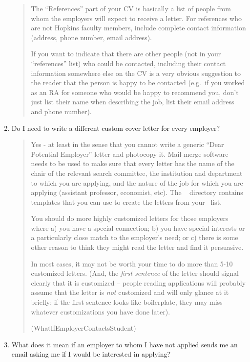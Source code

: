 \documentclass{\classes/econtex}
\providecommand\phantomsection{}
\begin{document}
\begin{enumerate}
    \begin{quote}
      The ``References'' part of your CV is basically a list of people from
      whom the employers will expect to receive a letter.  For references who
      are not Hopkins faculty members, include complete contact information
      (address, phone number, email address).

      If you want to indicate that there are other people (not in your
      ``references'' list) who could be contacted, including their contact
      information somewhere else on the CV is a very obvious suggestion to
      the reader that the person is happy to be contacted (e.g.\ if you
      worked as an RA for someone who would be happy to recommend you,
      don't just list their name when describing the job, list their email
      address and phone number).


    \end{quote}
  \item  Do I need to write a different custom cover letter for every employer?
    
    \begin{quote}
      Yes - at least in the sense that you cannot write a generic ``Dear Potential Employer'' letter
      and photocopy it.  Mail-merge software needs to be used to make sure
      that every letter has the name of the chair of the relevant search
      committee, the institution and department to which you are applying,
      and the nature of the job for which you are applying (assistant
      professor, economist, etc).  The \Templates~ directory contains templates that 
      you can use to create the letters from your \EMtt~list.  
      
      You should do more highly customized letters for those employers
      where a) you have a special connection; b) you have special
      interests or a particularly close match to the employer's need; or
      c) there is some other reason to think they might read the letter
      and find it persuasive.  

      In most cases, it may not be worth your time to do more than
      5-10 customized letters.  (And, the \textit{first sentence} of the letter should signal
      clearly that it is customized -- people reading applications will probably assume that the letter is \textit{not} customized and will only glance at it briefly; if the first sentence looks like boilerplate, they may miss whatever customizations you have done later).

      \ifdvi\phantomsection\hypertarget{WhatIfEmployerContactsStudent}{(WhatIfEmployerContactsStudent)}\fi
    \end{quote}
  \item  What does it mean if an employer to whom I have not applied sends me an email asking me if I would be interested in applying?


\end{enumerate}
\end{document}
